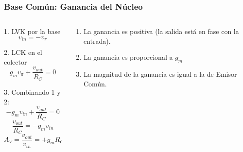 \begin{frame}[t]
    \frametitle{Base Común: Ganancia del Núcleo}

    \begin{columns}
        \begin{column}{0.35\textwidth}
            1. LVK por la base
            \[ v_{in} = -v_{\pi} \]

            2. LCK en el colector
            \[ g_m v_\pi + \dfrac{v_{out}}{R_C} = 0 \]

            3. Combinando 1 y 2:
            \[ -g_m v_{in} + \dfrac{v_{out}}{R_C} = 0 \]
            \[ \dfrac{v_{out}}{R_C} = -g_m v_{in} \]
            \[ \boxed{A_V = \dfrac{v_{out}}{v_{in}}} = +g_m R_C \]
        \end{column}
        \begin{column}{0.65\textwidth}
            \begin{figure}[H]
            \end{figure}

            \begin{enumerate}
                \item La ganancia es positiva (la salida está en fase con la entrada).
                \item La ganancia es proporcional a $g_m$
                \item La magnitud de la ganancia es igual a la de Emisor Común.
            \end{enumerate}
        \end{column}
    \end{columns}
\end{frame}

